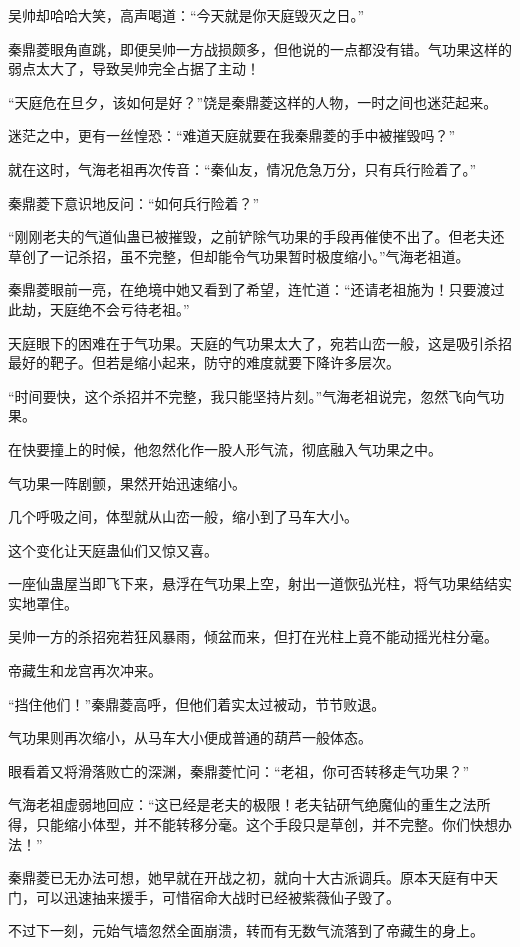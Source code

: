 \begin{this_body}
吴帅却哈哈大笑，高声喝道：“今天就是你天庭毁灭之日。”

秦鼎菱眼角直跳，即便吴帅一方战损颇多，但他说的一点都没有错。气功果这样的弱点太大了，导致吴帅完全占据了主动！

“天庭危在旦夕，该如何是好？”饶是秦鼎菱这样的人物，一时之间也迷茫起来。

迷茫之中，更有一丝惶恐：“难道天庭就要在我秦鼎菱的手中被摧毁吗？”

就在这时，气海老祖再次传音：“秦仙友，情况危急万分，只有兵行险着了。”

秦鼎菱下意识地反问：“如何兵行险着？”

“刚刚老夫的气道仙蛊已被摧毁，之前铲除气功果的手段再催使不出了。但老夫还草创了一记杀招，虽不完整，但却能令气功果暂时极度缩小。”气海老祖道。

秦鼎菱眼前一亮，在绝境中她又看到了希望，连忙道：“还请老祖施为！只要渡过此劫，天庭绝不会亏待老祖。”

天庭眼下的困难在于气功果。天庭的气功果太大了，宛若山峦一般，这是吸引杀招最好的靶子。但若是缩小起来，防守的难度就要下降许多层次。

“时间要快，这个杀招并不完整，我只能坚持片刻。”气海老祖说完，忽然飞向气功果。

在快要撞上的时候，他忽然化作一股人形气流，彻底融入气功果之中。

气功果一阵剧颤，果然开始迅速缩小。

几个呼吸之间，体型就从山峦一般，缩小到了马车大小。

这个变化让天庭蛊仙们又惊又喜。

一座仙蛊屋当即飞下来，悬浮在气功果上空，射出一道恢弘光柱，将气功果结结实实地罩住。

吴帅一方的杀招宛若狂风暴雨，倾盆而来，但打在光柱上竟不能动摇光柱分毫。

帝藏生和龙宫再次冲来。

“挡住他们！”秦鼎菱高呼，但他们着实太过被动，节节败退。

气功果则再次缩小，从马车大小便成普通的葫芦一般体态。

眼看着又将滑落败亡的深渊，秦鼎菱忙问：“老祖，你可否转移走气功果？”

气海老祖虚弱地回应：“这已经是老夫的极限！老夫钻研气绝魔仙的重生之法所得，只能缩小体型，并不能转移分毫。这个手段只是草创，并不完整。你们快想办法！”

秦鼎菱已无办法可想，她早就在开战之初，就向十大古派调兵。原本天庭有中天门，可以迅速抽来援手，可惜宿命大战时已经被紫薇仙子毁了。

不过下一刻，元始气墙忽然全面崩溃，转而有无数气流落到了帝藏生的身上。


\end{this_body}
